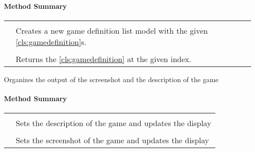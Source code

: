 \paragraph*{Method Summary}
\paragraph*{}
\begin{longtable}{Lp{10cm}}
	\startmethodtable
	 \\
	& Creates a new game definition list model with the given \ref{cls:gamedefinition}s. \\
	 \\
	& Returns the \ref{cls:gamedefinition} at the given index. \\
	\hline
\end{longtable}

\pagebreak

Organizes the output of the screenshot and the description of the game \\

\centerdash

\paragraph*{Method Summary}
\paragraph*{}
\begin{longtable}{Lp{10cm}}
	\startmethodtable
	 \\
	& Sets the description of the game and updates the display \\
	 \\
	& Sets the screenshot of the game and updates the display \\
	\hline
\end{longtable}